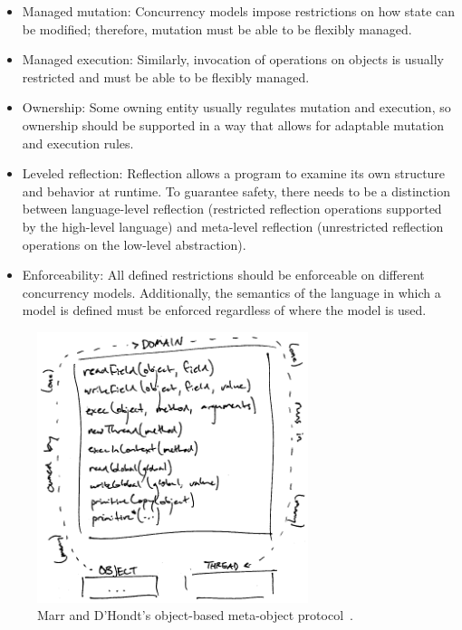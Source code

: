 \documentclass{sig-alternate}
\begin{document}
\begin{itemize}
  \item Managed mutation: Concurrency models impose restrictions on how state can be modified; therefore, mutation must be able to be flexibly managed.

  \item Managed execution: Similarly, invocation of operations on objects is usually restricted and must be able to be flexibly managed.

  \item Ownership: Some owning entity usually regulates mutation and execution, so ownership should be supported in a way that allows for adaptable mutation and execution rules.

  \item Leveled reflection: Reflection allows a program to examine its own structure and behavior at runtime. To guarantee safety, there needs to be a distinction between language-level reflection (restricted reflection operations supported by the high-level language) and meta-level reflection (unrestricted reflection operations on the low-level abstraction).

  \item Enforceability: All defined restrictions should be enforceable on different concurrency models. Additionally, the semantics of the language in which a model is defined must be enforced regardless of where the model is used.
\end{itemize}

\begin{figure}[h]
  \centering
  \includegraphics[width=224pt]{obmop}
  \caption{Marr and D'Hondt's object-based meta-object protocol~\cite{Marr2012}.}
\label{figure:obmop}
\end{figure}
\end{document}
